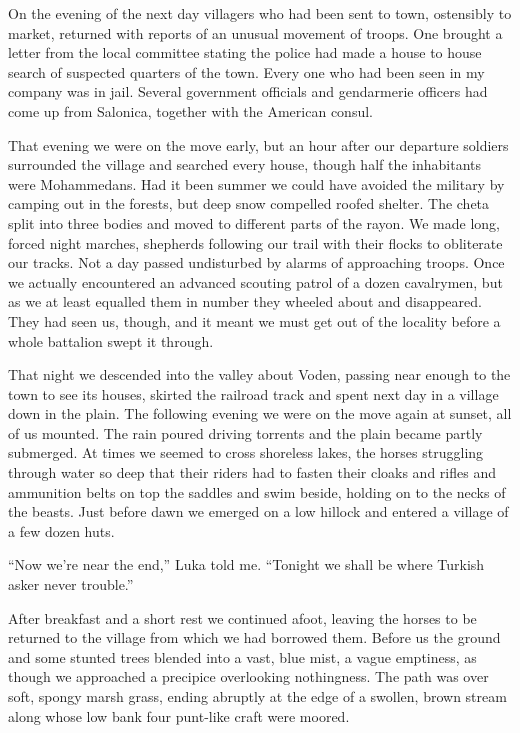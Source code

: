 \documentclass[a5paper,12pt]{book}
\begin{document}
On the evening of the next day villagers who had been sent to town, ostensibly to market, returned with reports of an unusual movement of troops. One brought a letter from the local committee stating the police had made a house to house search of suspected quarters of the town. Every one who had been seen in my company was in jail. Several government officials and gendarmerie officers had come up from Salonica, together with the American consul.

That evening we were on the move early, but an hour after our departure soldiers surrounded the village and searched every house, though half the inhabitants were Mohammedans. Had it been summer we could have avoided the military by camping out in the forests, but deep snow compelled roofed shelter. The cheta split into three bodies and moved to different parts of the rayon. We made long, forced night marches, shepherds following our trail with their flocks to obliterate our tracks. Not a day passed undisturbed by alarms of approaching troops. Once we actually encountered an advanced scouting patrol of a dozen cavalrymen, but as we at least equalled them in number they wheeled about and disappeared. They had seen us, though, and it meant we must get out of the locality before a whole battalion swept it through.

That night we descended into the valley about Voden, passing near enough to the town to see its houses, skirted the railroad track and spent next day in a village down in the plain. The following evening we were on the move again at sunset, all of us mounted. The rain poured driving torrents and the plain became partly submerged. At times we seemed to cross shoreless lakes, the horses struggling through water so deep that their riders had to fasten their cloaks and rifles and ammunition belts on top the saddles and swim beside, holding on to the necks of the beasts. Just before dawn we emerged on a low hillock and entered a village of a few dozen huts.

“Now we’re near the end,” Luka told me. “Tonight we shall be where Turkish asker never trouble.”

After breakfast and a short rest we continued afoot, leaving the horses to be returned to the village from which we had borrowed them. Before us the ground and some stunted trees blended into a vast, blue mist, a vague emptiness, as though we approached a precipice overlooking nothingness. The path was over soft, spongy marsh grass, ending abruptly at the edge of a swollen, brown stream along whose low bank four punt-like craft were moored.
\end{document}

